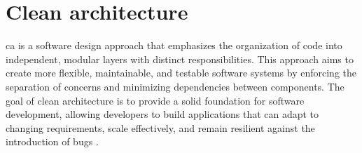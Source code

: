 \section{Clean architecture}\label{sec_ca_theory}

\gls{ca} is a software design approach that emphasizes the organization of code
into independent, modular layers with distinct responsibilities. This approach aims to
create more flexible, maintainable, and testable software systems by enforcing the
separation of concerns and minimizing dependencies between components. The goal of clean
architecture is to provide a solid foundation for software development, allowing
developers to build applications that can adapt to changing requirements, scale
effectively, and remain resilient against the introduction of bugs
\parencite{robert_c_martin_clean_2018}.





